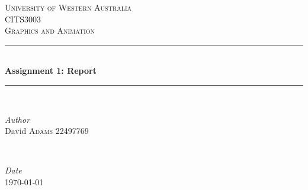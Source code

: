 \documentclass[12pt]{article}
\begin{document}
 

\begin{titlepage} %
	\newcommand{\HRule}{\rule{\linewidth}{0.5mm}} %
	
	\center %
	
	
	\textsc{\LARGE University of Western Australia}\\[1.5cm] %
	
	\textsc{\Large CITS3003}\\[0.5cm] %
	
	\textsc{\large Graphics and Animation}\\[0.5cm] %
	
	
	\HRule\\[0.4cm]
	
	{\huge\bfseries Assignment 1: Report}\\[0.4cm] %
	
	\HRule\\[1.5cm]
	
	
	\begin{minipage}{0.4\textwidth}
		\begin{flushleft}
			\large
			\textit{Author}\\
			David \textsc{Adams 22497769} %
		\end{flushleft}
	\end{minipage}
	~
	\begin{minipage}{0.4\textwidth}
		\begin{flushright}
			\large
			\textit{Date}\\
			 \today %
		\end{flushright}
	\end{minipage}
	

\end{titlepage}
\end{document}
